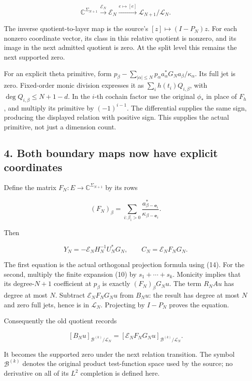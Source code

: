 \documentclass[
]{article}
\begin{document}
\[
\mathbb C^{\Sigma_{N+1}}\xrightarrow{\mathscr E_N}\mathcal E_N
\xrightarrow{e\mapsto[e]}\mathcal L_{N+1}/\mathcal L_N.
\tag{15}
\]

The inverse quotient-to-layer map is the source's
\([z]\mapsto(I-P_N)z\). For each nonzero coordinate vector, its class in
this relative quotient is nonzero, and its image in the next admitted
quotient is zero. At the split level this remains the next supported
zero.

For an explicit theta primitive, form
\(p_\beta-\sum_{|\alpha|\le N}p_\alpha a_\alpha^*G_Na_\beta/\kappa_\alpha\).
Its full jet is zero. Fixed-order monic division expresses it as
\(\sum_i h(t_i)Q_{i,\beta}\), with \(\deg Q_{i,\beta}\le N+1-d\). In the
\(i\)-th cochain factor use the original \(\phi_*\) in place of \(F_h\),
and multiply its primitive by \((-1)^{i-1}\). The differential supplies
the same sign, producing the displayed relation with positive sign. This
supplies the actual primitive, not just a dimension count.

\subsection{4. Both boundary maps now have explicit
coordinates}\label{both-boundary-maps-now-have-explicit-coordinates}

Define the matrix \(F_N:E\to\mathbb C^{\Sigma_{N+1}}\) by its rows

\[
(F_N)_\beta=\sum_{i:\beta_i>0}
\frac{a_{\beta-\mathbf e_i}^*}{\kappa_{\beta-\mathbf e_i}}.
\tag{16}
\]

Then

\[
\boxed{Y_N=-\mathscr E_NH_N^{-1}U_N^*G_N,
\qquad C_N=\mathscr E_NF_NG_N.}
\tag{17}
\]

The first equation is the actual orthogonal projection formula using
(14). For the second, multiply the finite expansion (10) by
\(s_1+\cdots+s_k\). Monicity implies that its degree-\(N+1\) coefficient
at \(p_\beta\) is exactly \((F_N)_\beta G_Nu\). The term \(R_NAu\) has
degree at most \(N\). Subtract \(\mathscr E_NF_NG_Nu\) from \(B_Nu\):
the result has degree at most \(N\) and zero full jets, hence is in
\(\mathcal L_N\). Projecting by \(I-P_N\) proves the equation.

Consequently the old quotient records

\[
\boxed{[B_Nu]_{\mathscr B^{(k)}/\mathcal L_N}
=[\mathscr E_NF_NG_Nu]_{\mathscr B^{(k)}/\mathcal L_N}.}
\tag{18}
\]

It becomes the supported zero under the next relation transition. The
symbol \(\mathscr B^{(k)}\) denotes the original product test-function
space used by the source; no derivative on all of its \(L^2\) completion
is defined here.
\end{document}
